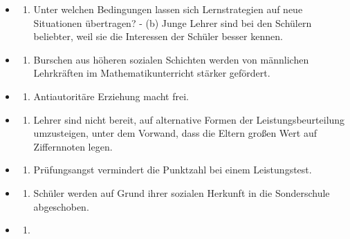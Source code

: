\documentclass[
]{book}
\providecommand{\tightlist}{%
  \setlength{\itemsep}{0pt}\setlength{\parskip}{0pt}}
\begin{document}
\begin{itemize}
\item
  \begin{enumerate}
  \def\labelenumi{(\alph{enumi})}
  \tightlist
  \item
    Unter welchen Bedingungen lassen sich Lernstrategien auf neue Situationen übertragen? - (b) Junge Lehrer sind bei den Schülern beliebter, weil sie die Interessen der Schüler besser kennen.
  \end{enumerate}
\item
  \begin{enumerate}
  \def\labelenumi{(\alph{enumi})}
  \setcounter{enumi}{2}
  \tightlist
  \item
    Burschen aus höheren sozialen Schichten werden von männlichen Lehrkräften im Mathematikunterricht stärker gefördert.
  \end{enumerate}
\item
  \begin{enumerate}
  \def\labelenumi{(\alph{enumi})}
  \setcounter{enumi}{3}
  \tightlist
  \item
    Antiautoritäre Erziehung macht frei.
  \end{enumerate}
\item
  \begin{enumerate}
  \def\labelenumi{(\alph{enumi})}
  \setcounter{enumi}{4}
  \tightlist
  \item
    Lehrer sind nicht bereit, auf alternative Formen der Leistungsbeurteilung umzusteigen, unter dem Vorwand, dass die Eltern großen Wert auf Ziffernnoten
    legen.
  \end{enumerate}
\item
  \begin{enumerate}
  \def\labelenumi{(\alph{enumi})}
  \setcounter{enumi}{5}
  \tightlist
  \item
    Prüfungsangst vermindert die Punktzahl bei einem Leistungstest.
  \end{enumerate}
\item
  \begin{enumerate}
  \def\labelenumi{(\alph{enumi})}
  \setcounter{enumi}{6}
  \tightlist
  \item
    Schüler werden auf Grund ihrer sozialen Herkunft in die Sonderschule abgeschoben.
  \end{enumerate}
\item
  \begin{enumerate}
  \def\labelenumi{(\alph{enumi})}
  \setcounter{enumi}{7}
  \tightlist
  \item

\end{enumerate}
\end{itemize}
\end{document}
